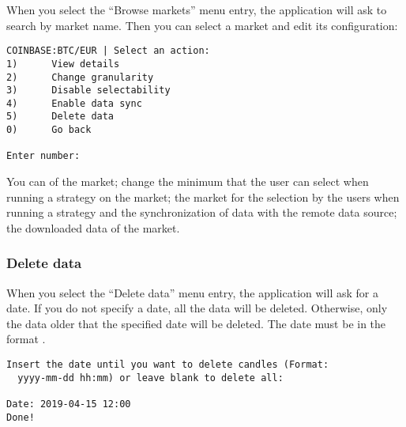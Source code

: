 When you select the ``Browse markets'' menu entry, the application will ask to
search by market name. Then you can select a market and edit its configuration:

\begin{verbatim}
COINBASE:BTC/EUR | Select an action:
1)      View details
2)      Change granularity
3)      Disable selectability
4)      Enable data sync
5)      Delete data
0)      Go back

Enter number:
\end{verbatim}

You can  of the market; change the minimum
 that the user can select when running a strategy on the
market;  the market for the selection by the users
when running a strategy and the synchronization of data with the remote data
source;  the downloaded data of the market.

\subsubsection{Delete data}

When you select the ``Delete data'' menu entry, the application will ask for a
date. If you do not specify a date, all the data will be deleted. Otherwise,
only the data older that the specified date will be deleted. The date must be in
the format .

\begin{verbatim}
Insert the date until you want to delete candles (Format:
  yyyy-mm-dd hh:mm) or leave blank to delete all:

Date: 2019-04-15 12:00
Done!
\end{verbatim}
